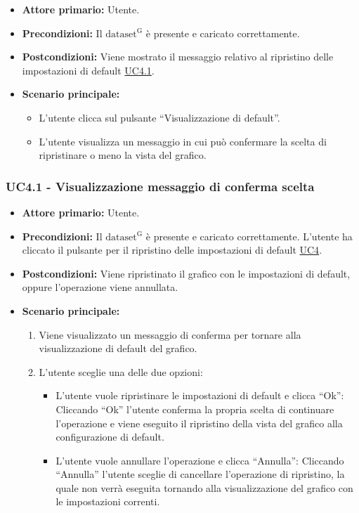 \begin{itemize}
	\item \textbf{Attore primario:} Utente.
	\item \textbf{Precondizioni:} Il ${\mathrm{dataset^{G}}}$ è presente e caricato correttamente.
	\item \textbf{Postcondizioni:} Viene mostrato il messaggio relativo al ripristino delle impostazioni di default \hyperref[sec:UC4.1]{UC4.1}.
	\item \textbf{Scenario principale:}
	\begin{itemize}
		\item L'utente clicca sul pulsante ``Visualizzazione di default''.
		\item L'utente visualizza un messaggio in cui può confermare la scelta di ripristinare o meno la vista del grafico.
	\end{itemize}
\end{itemize}

\subsubsection{UC4.1 - Visualizzazione messaggio di conferma scelta}
\label{sec:UC4.1}
\begin{itemize}
	\item \textbf{Attore primario:} Utente.
	\item \textbf{Precondizioni:} Il ${\mathrm{dataset^{G}}}$ è presente e caricato correttamente. L'utente ha cliccato il pulsante per il ripristino delle impostazioni di default \hyperref[sec:UC4]{UC4}.
	\item \textbf{Postcondizioni:} Viene ripristinato il grafico con le impostazioni di default, oppure l'operazione viene annullata.
	\item \textbf{Scenario principale:}
		\begin{enumerate}
		\item Viene visualizzato un messaggio di conferma per tornare alla visualizzazione di default del grafico.
		\item L'utente sceglie una delle due opzioni:
			\begin{itemize}
				\item L'utente vuole ripristinare le impostazioni di default e clicca ``Ok'':
                \newline 
                Cliccando ``Ok'' l'utente conferma la propria scelta di continuare l'operazione e
                viene eseguito il ripristino della vista del grafico alla configurazione di default.
				\item L'utente vuole annullare l'operazione e clicca ``Annulla'':
                \newline 
                Cliccando ``Annulla'' l'utente sceglie di cancellare l'operazione di ripristino, la quale non verrà eseguita
                tornando alla visualizzazione del grafico con le impostazioni correnti.
			\end{itemize}
		\end{enumerate}
\end{itemize}

